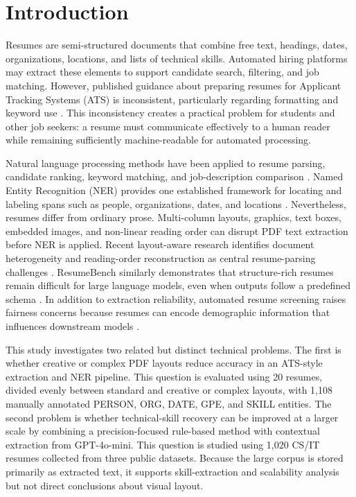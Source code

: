 \documentclass[conference]{IEEEtran}
\begin{document}
\section{Introduction}

Resumes are semi-structured documents that combine free text, headings, dates, organizations, locations, and lists of technical skills. Automated hiring platforms may extract these elements to support candidate search, filtering, and job matching. However, published guidance about preparing resumes for Applicant Tracking Systems (ATS) is inconsistent, particularly regarding formatting and keyword use \cite{lookadoo2025}. This inconsistency creates a practical problem for students and other job seekers: a resume must communicate effectively to a human reader while remaining sufficiently machine-readable for automated processing.

Natural language processing methods have been applied to resume parsing, candidate ranking, keyword matching, and job-description comparison \cite{bhatia2019resume,yadav2025}. Named Entity Recognition (NER) provides one established framework for locating and labeling spans such as people, organizations, dates, and locations \cite{conll2003}. Nevertheless, resumes differ from ordinary prose. Multi-column layouts, graphics, text boxes, embedded images, and non-linear reading order can disrupt PDF text extraction before NER is applied. Recent layout-aware research identifies document heterogeneity and reading-order reconstruction as central resume-parsing challenges \cite{zhu2025layout}. ResumeBench similarly demonstrates that structure-rich resumes remain difficult for large language models, even when outputs follow a predefined schema \cite{ling2025resumebench}. In addition to extraction reliability, automated resume screening raises fairness concerns because resumes can encode demographic information that influences downstream models \cite{parasurama2021}.

This study investigates two related but distinct technical problems. The first is whether creative or complex PDF layouts reduce accuracy in an ATS-style extraction and NER pipeline. This question is evaluated using 20 resumes, divided evenly between standard and creative or complex layouts, with 1,108 manually annotated PERSON, ORG, DATE, GPE, and SKILL entities. The second problem is whether technical-skill recovery can be improved at a larger scale by combining a precision-focused rule-based method with contextual extraction from GPT-4o-mini. This question is studied using 1,020 CS/IT resumes collected from three public datasets. Because the large corpus is stored primarily as extracted text, it supports skill-extraction and scalability analysis but not direct conclusions about visual layout.
\end{document}
